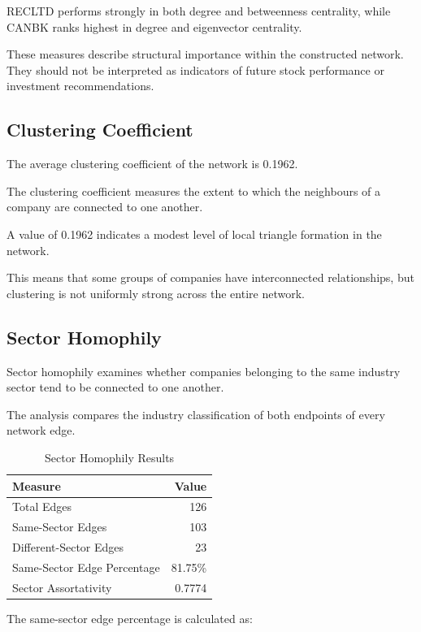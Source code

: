 \documentclass[11pt,a4paper]{article}
\begin{document}
RECLTD performs strongly in both degree and betweenness
centrality, while CANBK ranks highest in degree and
eigenvector centrality.

These measures describe structural importance within
the constructed network. They should not be interpreted
as indicators of future stock performance or investment
recommendations.

\subsection{Clustering Coefficient}

The average clustering coefficient of the network is
0.1962.

The clustering coefficient measures the extent to
which the neighbours of a company are connected
to one another.

A value of 0.1962 indicates a modest level of local
triangle formation in the network.

This means that some groups of companies have
interconnected relationships, but clustering is
not uniformly strong across the entire network.

\subsection{Sector Homophily}

Sector homophily examines whether companies belonging
to the same industry sector tend to be connected
to one another.

The analysis compares the industry classification
of both endpoints of every network edge.

\begin{table}[H]
\centering
\caption{Sector Homophily Results}
\label{tab:homophily}
\begin{tabular}{lr}
\toprule
\textbf{Measure} & \textbf{Value}\\
\midrule
Total Edges & 126\\
Same-Sector Edges & 103\\
Different-Sector Edges & 23\\
Same-Sector Edge Percentage & 81.75\%\\
Sector Assortativity & 0.7774\\
\bottomrule
\end{tabular}
\end{table}

The same-sector edge percentage is calculated as:
\end{document}
